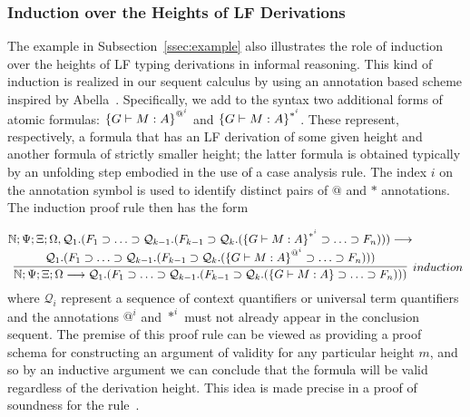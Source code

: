\subsubsection{Induction over the Heights of LF Derivations}

The example in Subsection~\ref{ssec:example} also illustrates the role
of induction over the heights of LF typing derivations in informal
reasoning. 
%
This kind of induction is realized in our sequent calculus by using an
annotation based scheme inspired by Abella~\cite{baelde14jfr,
  gacek09phd}.
%
Specifically, we add to the syntax two additional forms of atomic
formulas: $\eqannaux{i}{\fatm{G}{M:A}}$ and
$\ltannaux{i}{\fatm{G}{M:A}}$.
%
These represent, respectively, a formula that has an LF derivation of
some given height and another formula of strictly smaller height; the
latter formula is obtained typically by an unfolding step embodied in
the use of a case analysis rule.
% 
The index $i$ on the annotation symbol is used to identify distinct pairs of 
$@$ and $*$ annotations.
%
The induction proof rule then has the form

\[
\infer[induction]
      {\seq{\mathbb{N}}
           {\Psi}
           {\Xi}
           {\Omega}
           {\mathcal{Q}_1.(
             \fimp{F_1}{\fimp{\ldots}
                       {\mathcal{Q}_{k-1}.(
                         \fimp{F_{k-1}}
                              {\mathcal{Q}_k.
                                  (\fimp{\fatm{G}{M:A}}
                                        {\fimp{\ldots}{F_n}})})}})}}
      {\deduce{\mathcal{Q}_1.( 
                  \fimp{F_1}{\fimp{\ldots}
                                  {\mathcal{Q}_{k-1}}.(
                                    \fimp{F_{k-1}}
                                         {\mathcal{Q}_k.
                                            (\fimp{\eqannaux{i}{\fatm{G}{M:A}}}
                                                  {\fimp{\ldots}{F_n}})})})}
              {\seq{\mathbb{N}}
                   {\Psi}
                   {\Xi}
                   {\Omega,
                           \mathcal{Q}_1.( 
                              \fimp{F_1}{\fimp{\ldots}
                                              {\mathcal{Q}_{k-1}}.(
                                               \fimp{F_{k-1}}
                                                    {\mathcal{Q}_k.
                                                      (\fimp{\ltannaux{i}{\fatm{G}{M:A}}}
                                                            {\fimp{\ldots}{F_n}})})})}
                   {}}}
\]
where $\mathcal{Q}_i$ represent a sequence of context quantifiers or universal
term quantifiers and the annotations $@^i$ and $*^i$ must not already appear
in the conclusion sequent.
%
The premise of this proof rule can be viewed as providing a proof schema for
constructing an argument of validity for any particular height $m$, and so by 
an inductive argument we can conclude that the formula will be valid 
regardless of the derivation height.
%
This idea is made precise in a proof of soundness for the
rule~\cite{nadathur21arxiv,southern21phd}.

